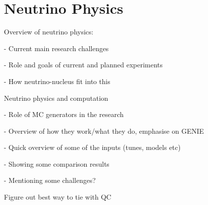 
\chapter{Neutrino Physics}

Overview of neutrino physics:

- Current main research challenges

- Role and goals of current and planned experiments

- How neutrino-nucleus fit into this

Neutrino physics and computation

- Role of MC generators in the research

- Overview of how they work/what they do, emphasise on GENIE

- Quick overview of some of the inputs (tunes, models etc)

- Showing some comparison results

- Mentioning some challenges?

Figure out best way to tie with QC